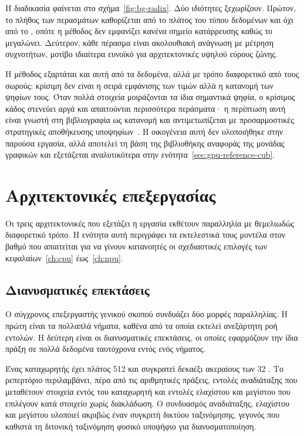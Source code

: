 Η διαδικασία φαίνεται στο σχήμα~\ref{fig:bg-radix}. Δύο ιδιότητες ξεχωρίζουν. Πρώτον, το πλήθος των περασμάτων καθορίζεται από το
πλάτος του τύπου δεδομένων και όχι από το , οπότε η μέθοδος δεν εμφανίζει
κανένα σημείο κατάρρευσης καθώς το  μεγαλώνει. Δεύτερον, κάθε πέρασμα είναι
ακολουθιακή ανάγνωση με μέτρηση συχνοτήτων, μοτίβο ιδιαίτερα ευνοϊκό για
αρχιτεκτονικές υψηλού εύρους ζώνης.

Η μέθοδος εξαρτάται και αυτή από τα δεδομένα, αλλά με τρόπο διαφορετικό από τους
σωρούς: κρίσιμη δεν είναι η σειρά εμφάνισης των τιμών αλλά η κατανομή των ψηφίων
τους. Όταν πολλά στοιχεία μοιράζονται τα ίδια σημαντικά ψηφία, ο κρίσιμος κάδος
στενεύει αργά και απαιτούνται περισσότερα περάσματα· η περίπτωση αυτή είναι
γνωστή στη βιβλιογραφία ως  κατανομή και αντιμετωπίζεται με
προσαρμοστικές στρατηγικές αποθήκευσης υποψηφίων~\cite{zhang2023gputopk}. Η οικογένεια αυτή δεν
υλοποιήθηκε στην παρούσα εργασία, αλλά αποτελεί τη βάση της βιβλιοθήκης αναφοράς
της μονάδας γραφικών και εξετάζεται αναλυτικότερα στην
ενότητα~\ref{sec:gpu-reference-cub}.



\section{Αρχιτεκτονικές επεξεργασίας}
\label{sec:bg-architectures}

Οι τρεις αρχιτεκτονικές που εξετάζει η εργασία εκθέτουν παραλληλία με
θεμελιωδώς διαφορετικό τρόπο. Η ενότητα αυτή περιγράφει τα εκτελεστικά τους
μοντέλα στον βαθμό που απαιτείται για να γίνουν κατανοητές οι σχεδιαστικές
επιλογές των κεφαλαίων~\ref{ch:cpu} έως~\ref{ch:npu}.

\subsection{Διανυσματικές επεκτάσεις }
\label{sec:bg-arch-cpu}

Ο σύγχρονος επεξεργαστής γενικού σκοπού συνδυάζει δύο μορφές παραλληλίας. Η
πρώτη είναι τα πολλαπλά νήματα, καθένα από τα οποία εκτελεί ανεξάρτητη ροή
εντολών. Η δεύτερη είναι οι διανυσματικές επεκτάσεις, οι οποίες εφαρμόζουν την
ίδια πράξη σε πολλά δεδομένα ταυτόχρονα εντός ενός νήματος.

Ένας καταχωρητής  έχει πλάτος 512  και συγκρατεί δεκαέξι
ακεραίους των 32 . Το ρεπερτόριο περιλαμβάνει, πέρα από τις αριθμητικές
πράξεις, εντολές αναδιάταξης που μεταθέτουν στοιχεία εντός του καταχωρητή και
εντολές ελαχίστου και μεγίστου που επιλέγουν κατά στοιχείο χωρίς διακλάδωση. Ο
συνδυασμός αναδιάταξης, ελαχίστου και μεγίστου υλοποιεί ακριβώς έναν συγκριτή
δικτύου ταξινόμησης, γεγονός που καθιστά τη διτονική ταξινόμηση φυσικό υποψήφιο
για διανυσματοποίηση.


